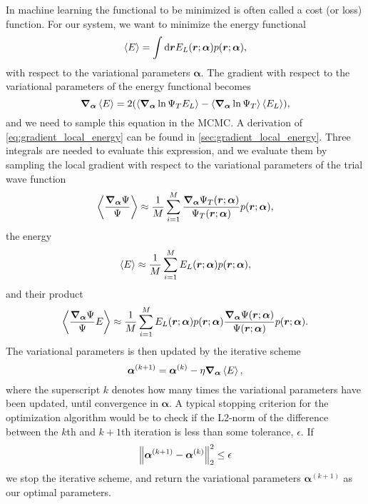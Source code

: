 In machine learning the functional to be minimized is often called a cost (or loss) function. For our system, we want to minimize the energy functional
\begin{equation}
    \expval{E} = \int\mathrm{d}\bm{r}E_L(\bm{r};\bm{\alpha})p(\bm{r};\bm{\alpha}),  
\end{equation}
with respect to the variational parameters $\bm{\alpha}$. The gradient with respect to the variational parameters of the energy functional becomes
\begin{equation}\label{eq:gradient_local_energy}
    \grad_{\bm{\alpha}}\expval{E} = 2\qty(\expval{\grad_{\mathrm{\bm{\alpha}}}\ln{\Psi_T}E_L} - \expval{\grad_{\mathrm{\bm{\alpha}}}\ln{\Psi_T}}\expval{E_L}), 
\end{equation}
and we need to sample this equation in the MCMC. A derivation of \autoref{eq:gradient_local_energy} can be found in \autoref{sec:gradient_local_energy}. Three integrals are needed to evaluate this expression, and we evaluate them by sampling the local gradient with respect to the variational parameters of the trial wave function 
\begin{equation}
    \expval{\frac{\grad_{\bm{\alpha}}\Psi}{\Psi}} \approx \frac{1}{M}\sum_{i=1}^M\frac{\grad_{\bm{\alpha}}\Psi_T(\bm{r};\bm{\alpha})}{\Psi_T(\bm{r};\bm{\alpha})}p(\bm{r};\bm{\alpha}), 
\end{equation}
the energy
\begin{equation}
    \expval{E} \approx \frac{1}{M}\sum_{i=1}^ME_L(\bm{r};\bm{\alpha})p(\bm{r};\bm{\alpha}), 
\end{equation}
and their product
\begin{equation}
    \expval{\frac{\grad_{\bm{\alpha}}\Psi}{\Psi}E} \approx \frac{1}{M}\sum_{i=1}^M E_L(\bm{r};\bm{\alpha})p(\bm{r};\bm{\alpha})\frac{\grad_{\bm{\alpha}}\Psi(\bm{r};\bm{\alpha})}{\Psi(\bm{r};\bm{\alpha})}p(\bm{r};\bm{\alpha}).
\end{equation}
The variational parameters is then updated by the iterative scheme 
\begin{equation}
    \bm{\alpha}^{(k+1)} = \bm{\alpha}^{(k)} - \eta\grad_{\bm{\alpha}}\expval{E}, 
\end{equation}
where the superscript $k$ denotes how many times the variational parameters have been updated, until convergence in $\bm{\alpha}$. A typical stopping criterion for the optimization algorithm would be to check if the L2-norm of the difference between the $k$th and $k+1$th iteration is less than some tolerance, $\epsilon$. If
\begin{equation}
    \norm{\bm{\alpha}^{(k+1)}-\bm{\alpha}^{(k)}}_2^2 \leq \epsilon 
\end{equation}
we stop the iterative scheme, and return the variational parameters $\bm{\alpha}^{(k+1)}$ as our optimal parameters.

